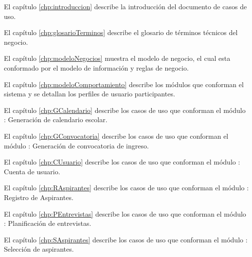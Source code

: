 \begin{Citemize}
	
	\item El capítulo \ref{chp:introduccion} describe la introducción del documento de casos de uso.
	
	\item El capítulo \ref{chp:glosarioTerminos} describe el glosario de términos técnicos del negocio.
	
	\item El capítulo \ref{chp:modeloNegocios}  muestra el modelo de negocio, el cual esta conformado por el modelo de información y reglas de negocio.
	
	\item El capítulo \ref{chp:modeloComportamiento} describe los módulos que conforman el sistema y se detallan los perfiles de usuario participantes.\label{chp:modeloComportamiento}
	
	\item El capítulo \ref{chp:GCalendario} describe los casos de uso que conforman el módulo : Generación de calendario escolar.
	
	\item El capítulo \ref{chp:GConvocatoria} describe los casos de uso que conforman el módulo : Generación de convocatoria de ingreso.
	
	\item El capítulo \ref{chp:CUsuario} describe los casos de uso que conforman el módulo : Cuenta de usuario.
	
	\item El capítulo \ref{chp:RAspirantes} describe los casos de uso que conforman el módulo : Registro de Aspirantes.
	
	
	
	
	\item El capítulo \ref{chp:PEntrevistas} describe los casos de uso que conforman el módulo : Planificación de entrevistas.
	
	\item El capítulo \ref{chp:SAspirantes} describe los casos de uso que conforman el módulo : Selección de aspirantes.
	

\end{Citemize}
